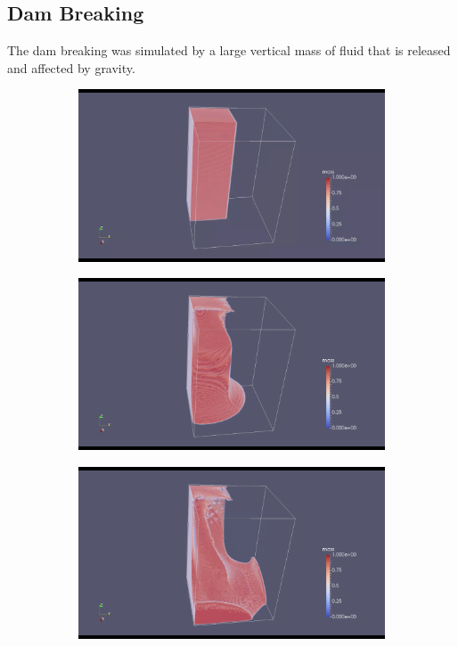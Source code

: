 \documentclass[10pt,a4paper,notitlepage]{article}
\begin{document}
\subsection{Dam Breaking}
The dam breaking was simulated by a large vertical mass of fluid that is released and affected by gravity.
\begin{figure}[H]
\centering
\begin{subfigure}{0.25\textwidth}
  \includegraphics[width=1.0\linewidth]{dam/1.png}
\end{subfigure}%
\begin{subfigure}{0.25\textwidth}
  \includegraphics[width=1.0\linewidth]{dam/2.png}
\end{subfigure}
\begin{subfigure}{0.25\textwidth}
  \includegraphics[width=1.0\linewidth]{dam/3.png}

\end{subfigure}
\end{figure}
\end{document}
